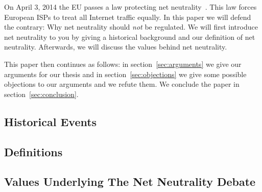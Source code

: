 
On April 3, 2014 the EU passes a law protecting net neutrality~\cite{whittaker2014eu}. This law forces European \acp{ISP} to treat all Internet traffic equally. In this paper we will defend the contrary: Why net neutrality should \emph{not} be regulated. We will first introduce net neutrality to you by giving a historical background and our definition of net neutrality. Afterwards, we will discuss the values behind net neutrality.

This paper then continues as follows: in section~\ref{sec:arguments} we give our arguments for our thesis and in section~\ref{sec:objections} we give some possible objections to our arguments and we refute them. We conclude the paper in section~\ref{sec:conclusion}.

\subsection{Historical Events}
\label{sec:intro_problem}


\subsection{Definitions}
\label{sec:intro_def}


\subsection{Values Underlying The Net Neutrality Debate}
\label{sec:intro_values}
